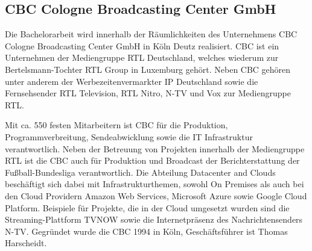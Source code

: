 \subsection{CBC Cologne Broadcasting Center GmbH}

Die Bachelorarbeit wird innerhalb der Räumlichkeiten des Unternehmens CBC Cologne Broadcasting Center GmbH in Köln Deutz realisiert.
CBC ist ein Unternehmen der Mediengruppe RTL Deutschland, welches wiederum zur Bertelsmann-Tochter RTL Group in Luxemburg gehört.
Neben CBC gehören unter anderem der Werbezeitenvermarkter IP Deutschland sowie die Fernsehsender RTL Television, RTL Nitro, N-TV und Vox zur Mediengruppe RTL.


Mit ca. 550 festen Mitarbeitern ist CBC für die Produktion, Programmverbreitung, Sendeabwicklung sowie die IT Infrastruktur verantwortlich.
Neben der Betreuung von Projekten innerhalb der Mediengruppe RTL ist die CBC auch für Produktion und Broadcast der Berichterstattung der Fußball-Bundesliga verantwortlich.
Die Abteilung Datacenter and Clouds beschäftigt sich dabei mit Infrastrukturthemen, sowohl On Premises als auch bei den Cloud Providern Amazon Web Services, Microsoft Azure sowie Google Cloud Platform.
Beispiele für Projekte, die in der Cloud umgesetzt wurden sind die Streaming-Plattform TVNOW sowie die Internetpräsenz des Nachrichtensenders N-TV.
Gegründet wurde die CBC 1994 in Köln, Geschäftsführer ist Thomas Harscheidt.
